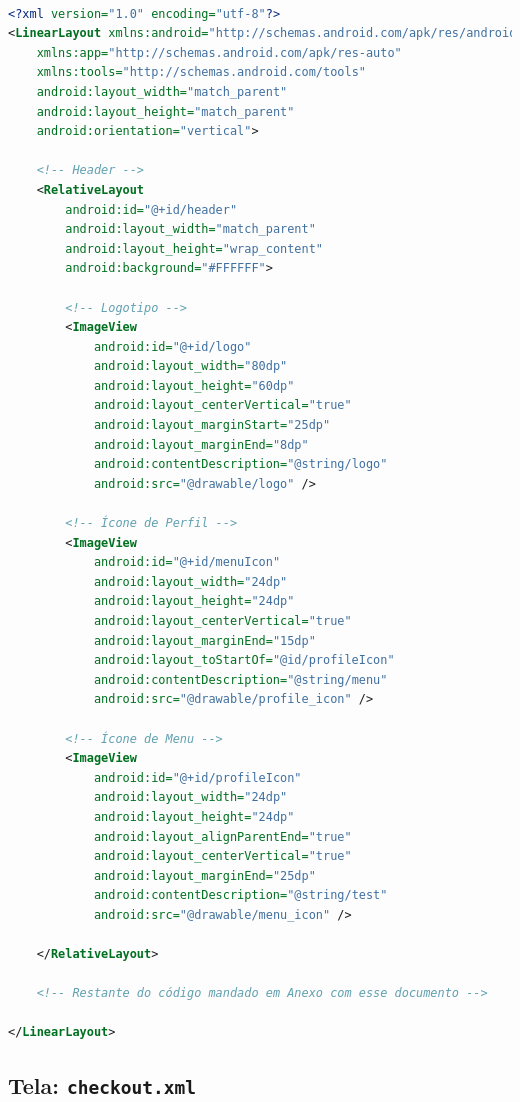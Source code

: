 \documentclass[
	12pt,				%
	openright,			%
	twoside,			%
	a4paper,			%
	english,			%
	brazil				%
	]{abntex2}
\begin{document}
\begin{lstlisting}[language=XML, caption=Exemplo de Código XML, label=lst:xml]

<?xml version="1.0" encoding="utf-8"?>
<LinearLayout xmlns:android="http://schemas.android.com/apk/res/android"
    xmlns:app="http://schemas.android.com/apk/res-auto"
    xmlns:tools="http://schemas.android.com/tools"
    android:layout_width="match_parent"
    android:layout_height="match_parent"
    android:orientation="vertical">

    <!-- Header -->
    <RelativeLayout
        android:id="@+id/header"
        android:layout_width="match_parent"
        android:layout_height="wrap_content"
        android:background="#FFFFFF">

        <!-- Logotipo -->
        <ImageView
            android:id="@+id/logo"
            android:layout_width="80dp"
            android:layout_height="60dp"
            android:layout_centerVertical="true"
            android:layout_marginStart="25dp"
            android:layout_marginEnd="8dp"
            android:contentDescription="@string/logo"
            android:src="@drawable/logo" />

        <!-- Ícone de Perfil -->
        <ImageView
            android:id="@+id/menuIcon"
            android:layout_width="24dp"
            android:layout_height="24dp"
            android:layout_centerVertical="true"
            android:layout_marginEnd="15dp"
            android:layout_toStartOf="@id/profileIcon"
            android:contentDescription="@string/menu"
            android:src="@drawable/profile_icon" />

        <!-- Ícone de Menu -->
        <ImageView
            android:id="@+id/profileIcon"
            android:layout_width="24dp"
            android:layout_height="24dp"
            android:layout_alignParentEnd="true"
            android:layout_centerVertical="true"
            android:layout_marginEnd="25dp"
            android:contentDescription="@string/test"
            android:src="@drawable/menu_icon" />

    </RelativeLayout>

	<!-- Restante do código mandado em Anexo com esse documento -->

</LinearLayout>

\end{lstlisting}

\subsection{Tela: \texttt{checkout.xml}}
\end{document}
